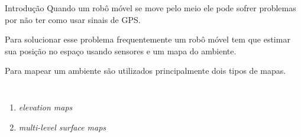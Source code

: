\begin{frame}[t]{Introdução} 
    \transdissolve[duration=0.5]
    Quando um robô móvel se move pelo meio ele pode sofrer problemas por não ter como usar sinais de GPS.

    Para solucionar esse problema frequentemente um robô móvel tem que estimar sua posição no espaço usando sensores e um mapa do ambiente.

    Para mapear um ambiente são utilizados principalmente dois tipos de mapas.
        \begin{columns}[t]
                \begin{enumerate}
                    \item \textit{elevation maps}
                    \item \textit{multi-level surface maps}
                \end{enumerate}

        \end{columns}
\end{frame}


